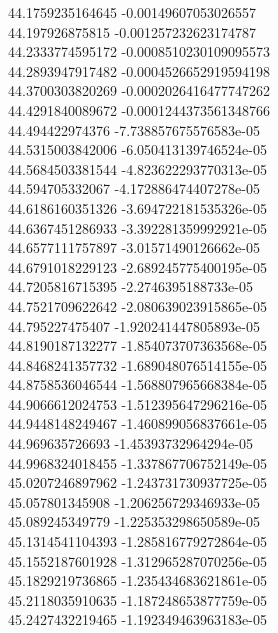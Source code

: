 {44.1759235164645 -0.00149607053026557 \\
44.197926875815 -0.001257232623174787 \\
44.2333774595172 -0.0008510230109095573 \\
44.2893947917482 -0.0004526652919594198 \\
44.3700303820269 -0.0002026416477747262 \\
44.4291840089672 -0.0001244373561348766 \\
44.494422974376 -7.738857675576583e-05 \\
44.5315003842006 -6.050413139746524e-05 \\
44.5684503381544 -4.823622293770313e-05 \\
44.594705332067 -4.172886474407278e-05 \\
44.6186160351326 -3.694722181535326e-05 \\
44.6367451286933 -3.392281359992921e-05 \\
44.6577111757897 -3.01571490126662e-05 \\
44.6791018229123 -2.689245775400195e-05 \\
44.7205816715395 -2.2746395188733e-05 \\
44.7521709622642 -2.080639023915865e-05 \\
44.795227475407 -1.920241447805893e-05 \\
44.8190187132277 -1.854073707363568e-05 \\
44.8468241357732 -1.689048076514155e-05 \\
44.8758536046544 -1.568807965668384e-05 \\
44.9066612024753 -1.512395647296216e-05 \\
44.9448148249467 -1.460899056837661e-05 \\
44.969635726693 -1.45393732964294e-05 \\
44.9968324018455 -1.337867706752149e-05 \\
45.0207246897962 -1.243731730937725e-05 \\
45.057801345908 -1.206256729346933e-05 \\
45.089245349779 -1.225353298650589e-05 \\
45.1314541104393 -1.285816779272864e-05 \\
45.1552187601928 -1.312965287070256e-05 \\
45.1829219736865 -1.235434683621861e-05 \\
45.2118035910635 -1.187248653877759e-05 \\
45.2427432219465 -1.192349463963183e-05 \\
}
